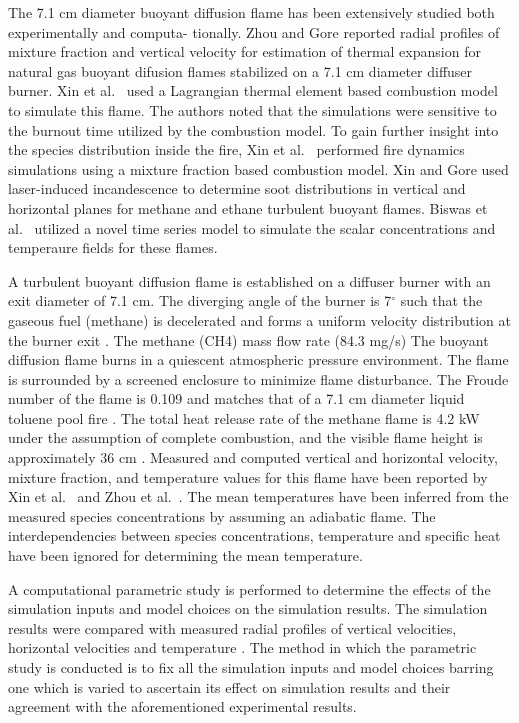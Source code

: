 The 7.1 cm diameter buoyant diffusion flame has been extensively studied both experimentally and computa- tionally. Zhou and Gore \cite{Zhou:CS1998} reported radial profiles of mixture fraction and vertical velocity for estimation of thermal expansion for natural gas buoyant difusion flames stabilized on a 7.1 cm diameter diffuser burner. Xin et al.~\cite{Xin:CSS2002} used a Lagrangian thermal element based combustion model to simulate this flame. The authors noted that the simulations were sensitive to the burnout time utilized by the combustion model. To gain further insight into the species distribution inside the fire, Xin et al.~\cite{Xin:CF2005} performed fire dynamics simulations using a mixture fraction based combustion model. Xin and Gore \cite{Xin:CS2005} used laser-induced incandescence to determine soot distributions in vertical and horizontal planes for methane and ethane turbulent buoyant flames. Biswas et al.~\cite{Biswas:CS2007} utilized a novel time series model to simulate the scalar concentrations and temperaure fields for these flames.

A turbulent buoyant diffusion flame is established on a diffuser burner with an exit diameter of 7.1 cm. The diverging angle of the burner is 7$^\circ$ such that the gaseous fuel (methane) is decelerated and forms a uniform velocity distribution at the burner exit \cite{Xin:CF2005}. The methane (CH4) mass flow rate (84.3 mg/s) The buoyant diffusion flame burns in a quiescent atmospheric pressure environment. The flame is surrounded by a screened enclosure to minimize flame disturbance. The Froude number of the flame is 0.109 and matches that of a 7.1 cm diameter liquid toluene pool fire \cite{Xin:CF2005,Zhou:CS1998}. The total heat release rate of the methane flame is 4.2 kW under the assumption of complete combustion, and the visible flame height is approximately 36 cm \cite{Xin:CF2005}. Measured and computed vertical and horizontal velocity, mixture fraction, and temperature values for this flame have been reported by Xin et al.~\cite{Xin:CF2005,Xin:PhD2002} and Zhou et al.~\cite{Zhou:CS1998,Zhou:PurduePhD1999}. The mean temperatures have been inferred from the measured species concentrations \cite{Xin:CF2005} by assuming an adiabatic flame. The interdependencies between species concentrations, temperature and specific heat have been ignored for determining the mean temperature.  

A computational parametric study is performed to determine the effects of the simulation inputs and model choices on the simulation results. The simulation results were compared with measured radial profiles of vertical velocities, horizontal velocities and temperature \cite{Xin:CF2005}. The method in which the parametric study is conducted is to fix all the simulation inputs and model choices barring one which is varied to ascertain its effect on simulation results and their agreement with the aforementioned experimental results.

